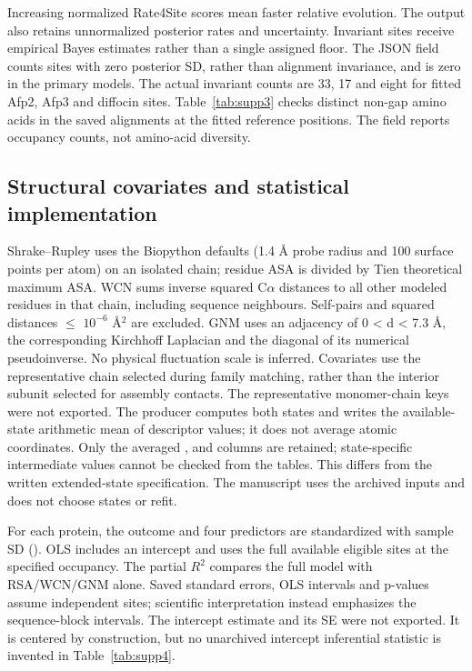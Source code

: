 Increasing normalized Rate4Site scores mean faster relative evolution. The output also retains unnormalized posterior rates and uncertainty. Invariant sites receive empirical Bayes estimates rather than a single assigned floor. The JSON field  counts sites with zero posterior SD, rather than alignment invariance, and is zero in the primary models. The actual invariant counts are 33, 17 and eight for fitted Afp2, Afp3 and diffocin sites. Table~\ref{tab:supp3} checks distinct non-gap amino acids in the saved alignments at the fitted reference positions. The  field reports occupancy counts, not amino-acid diversity.

\subsection{Structural covariates and statistical implementation}

Shrake--Rupley uses the Biopython defaults (1.4 \AA{} probe radius and 100 surface points per atom) on an isolated chain; residue ASA is divided by Tien theoretical maximum ASA. WCN sums inverse squared C\ensuremath{\alpha} distances to all other modeled residues in that chain, including sequence neighbours. Self-pairs and squared distances \ensuremath{\leq} \(10^{-6}\) \AA{}\ensuremath{^2} are excluded. GNM uses an adjacency of 0 < d < 7.3 \AA{}, the corresponding Kirchhoff Laplacian and the diagonal of its numerical pseudoinverse. No physical fluctuation scale is inferred. Covariates use the representative chain selected during family matching, rather than the interior subunit selected for assembly contacts. The representative monomer-chain keys were not exported. The producer computes both states and writes the available-state arithmetic mean of descriptor values; it does not average atomic coordinates. Only the averaged ,  and  columns are retained; state-specific intermediate values cannot be checked from the tables. This differs from the written extended-state specification. The manuscript uses the archived inputs and does not choose states or refit.

For each protein, the outcome and four predictors are standardized with sample SD (). OLS includes an intercept and uses the full available eligible sites at the specified occupancy. The partial \(R^2\) compares the full model with RSA/WCN/GNM alone. Saved standard errors, OLS intervals and p-values assume independent sites; scientific interpretation instead emphasizes the sequence-block intervals. The intercept estimate and its SE were not exported. It is centered by construction, but no unarchived intercept inferential statistic is invented in Table~\ref{tab:supp4}.


